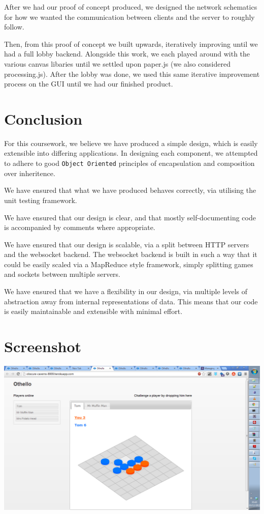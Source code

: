 \documentclass[a4wide, 11pt]{article}
\begin{document}
After we had our proof of concept produced, we designed the network schematics for how we wanted the communication between clients and the server to roughly follow.

Then, from this proof of concept we built upwards, iteratively improving until we had a full lobby backend. Alongside this work, we each played around with the various canvas libaries until we settled upon paper.js (we also considered processing.js). After the lobby was done, we used this same iterative improvement process on the GUI until we had our finished product.

\section{Conclusion}

For this coursework, we believe we have produced a simple design, which is easily extensible into differing applications. In designing each component, we attempted to adhere to good \texttt{Object Oriented} principles of encapsulation and composition over inheritence.

We have ensured that what we have produced behaves correctly, via utilising the unit testing framework. 

We have ensured that our design is clear, and that mostly self-documenting code is accompanied by comments where appropriate.

We have ensured that our design is scalable, via a split between HTTP servers and the websocket backend. The websocket backend is built in such a way that it could be easily scaled via a MapReduce style framework, simply splitting games and sockets between multiple servers.

We have ensured that we have a flexibility in our design, via multiple levels of abstraction away from internal representations of data. This means that our code is easily maintainable and extensible with minimal effort.


\section{Screenshot}

\includegraphics[width=\textwidth]{Screenshot.png}
\end{document}
